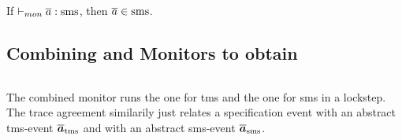\documentclass[utf8,acmsmall,review,screen,dvipsnames]{acmart}
\begin{document}


\begin{lemma}\label{lem:mon:smsafe}
  If $\monsmssafe{\trace}$, then $\trace\in\smssafe$.\Coqed
\end{lemma}

\subsection{Combining  and  Monitors to obtain }\label{subsubsec:ms}

\begin{center}
  $\;$\\
\end{center}
The combined monitor runs the one for \gls{tms} and the one for \gls{sms} in a lockstep. The trace agreement similarily just relates a specification event with an abstract \gls{tms}-event $\abstrace[_{\tmssafe}]$ and with an abstract \gls{sms}-event $\abstrace[_{\smssafe}]$.
\end{document}
